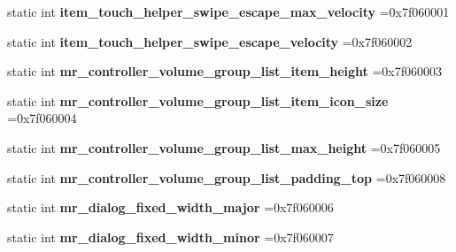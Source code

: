 \begin{DoxyCompactItemize}
static int {\bfseries item\+\_\+touch\+\_\+helper\+\_\+swipe\+\_\+escape\+\_\+max\+\_\+velocity} =0x7f060001
\item 
\mbox{\label{classandroid_1_1support_1_1v7_1_1recyclerview_1_1R_1_1dimen_a064d677e94e4ba1a97989a6faa06e00f}} 
static int {\bfseries item\+\_\+touch\+\_\+helper\+\_\+swipe\+\_\+escape\+\_\+velocity} =0x7f060002
\item 
\mbox{\label{classandroid_1_1support_1_1v7_1_1recyclerview_1_1R_1_1dimen_a37b3bef6e2d6b8b5da8d9fa071e67993}} 
static int {\bfseries mr\+\_\+controller\+\_\+volume\+\_\+group\+\_\+list\+\_\+item\+\_\+height} =0x7f060003
\item 
\mbox{\label{classandroid_1_1support_1_1v7_1_1recyclerview_1_1R_1_1dimen_a2152215914d9a1ffb1de023b581bc75e}} 
static int {\bfseries mr\+\_\+controller\+\_\+volume\+\_\+group\+\_\+list\+\_\+item\+\_\+icon\+\_\+size} =0x7f060004
\item 
\mbox{\label{classandroid_1_1support_1_1v7_1_1recyclerview_1_1R_1_1dimen_a8c4b5eb7101c881d148603098130ee7a}} 
static int {\bfseries mr\+\_\+controller\+\_\+volume\+\_\+group\+\_\+list\+\_\+max\+\_\+height} =0x7f060005
\item 
\mbox{\label{classandroid_1_1support_1_1v7_1_1recyclerview_1_1R_1_1dimen_a0d768c226a76fdd9ffa8ff43750831bd}} 
static int {\bfseries mr\+\_\+controller\+\_\+volume\+\_\+group\+\_\+list\+\_\+padding\+\_\+top} =0x7f060008
\item 
\mbox{\label{classandroid_1_1support_1_1v7_1_1recyclerview_1_1R_1_1dimen_a94daededdc829e75f6e1228d7aa98c94}} 
static int {\bfseries mr\+\_\+dialog\+\_\+fixed\+\_\+width\+\_\+major} =0x7f060006
\item 
\mbox{\label{classandroid_1_1support_1_1v7_1_1recyclerview_1_1R_1_1dimen_a2748ccde5e974134f0df3ebbad77ccd1}} 
static int {\bfseries mr\+\_\+dialog\+\_\+fixed\+\_\+width\+\_\+minor} =0x7f060007

\end{DoxyCompactItemize}

